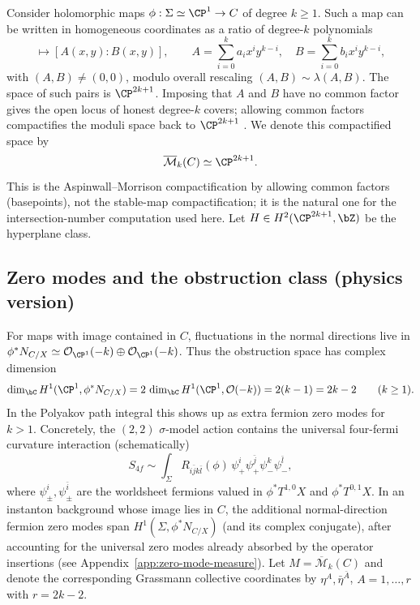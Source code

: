 \documentclass[12pt]{article}
\begin{document}
Consider holomorphic maps $\phi:\Sigma\simeq\CP^1\to C$ of degree $k\ge1$. Such a
map can be written in homogeneous coordinates as a ratio of degree-$k$
polynomials
\begin{equation}
  [x:y]\mapsto [A(x,y):B(x,y)],
  \qquad
  A=\sum_{i=0}^k a_i x^i y^{k-i},\quad
  B=\sum_{i=0}^k b_i x^i y^{k-i},
\end{equation}
with $(A,B)\neq(0,0)$, modulo overall rescaling $(A,B)\sim \lambda(A,B)$. The
space of such pairs is $\CP^{2k+1}$. Imposing that $A$ and $B$ have no common
factor gives the open locus of honest degree-$k$ covers; allowing common factors
compactifies the moduli space back to $\CP^{2k+1}$ \cite{AspinwallMorrison:1991tft}.
We denote this compactified space by
\begin{equation}
  \overline{\mathcal{M}}_k(C)\simeq \CP^{2k+1}.
\end{equation}
This is the Aspinwall--Morrison compactification by allowing common factors (basepoints),
not the stable-map compactification; it is the natural one for the intersection-number
computation used here.
Let $H\in H^2(\CP^{2k+1},\bZ)$ be the hyperplane class.

\subsection{Zero modes and the obstruction class (physics version)}
For maps with image contained in $C$, fluctuations in the normal directions live
in $\phi^*N_{C/X}\simeq\mathcal{O}_{\CP^1}(-k)\oplus\mathcal{O}_{\CP^1}(-k)$.
Thus the obstruction space has complex dimension
\begin{equation}
  \dim_\bC H^1(\CP^1,\phi^*N_{C/X})
  = 2\,\dim_\bC H^1(\CP^1,\mathcal{O}(-k))
  = 2(k-1)=2k-2
  \qquad (k\ge1).
\end{equation}
In the Polyakov path integral this shows up as extra fermion zero modes for
$k>1$. Concretely, the $(2,2)$ $\sigma$-model action contains the universal
four-fermi curvature interaction (schematically)
\begin{equation*}
  S_{4f}\sim \int_\Sigma R_{i\bar jk\bar l}(\phi)\,
  \psi_{+}^{i}\psi_{+}^{\bar j}\psi_{-}^{k}\psi_{-}^{\bar l},
\end{equation*}
where $\psi_\pm^i,\psi_\pm^{\bar i}$ are the worldsheet fermions valued in
$\phi^*T^{1,0}X$ and $\phi^*T^{0,1}X$. In an instanton background whose image
lies in $C$, the additional normal-direction fermion zero modes span
$H^1(\Sigma,\phi^*N_{C/X})$ (and its complex conjugate), after accounting for
the universal zero modes already absorbed by the operator insertions (see
Appendix~\ref{app:zero-mode-measure}). Let
$M=\overline{\mathcal{M}}_k(C)$ and denote the corresponding Grassmann
collective coordinates by $\eta^A,\bar\eta^{\bar A}$, $A=1,\dots,r$ with
$r=2k-2$.
\end{document}
